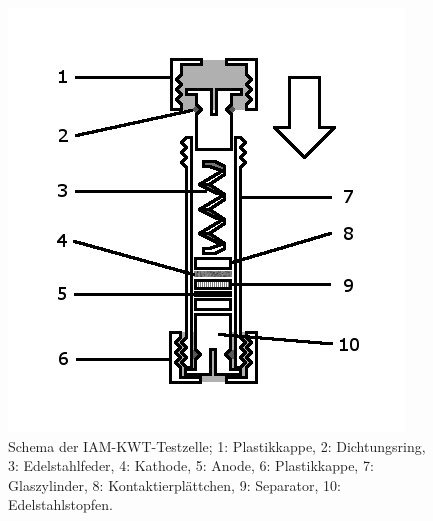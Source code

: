 \documentclass[a4paper, 11pt, headsepline,footsepline,twoside,abstract]{scrbook}
\begin{document}
\begin{figure}
	\centering
	\includegraphics[width=0.55\columnwidth]{images/Schema_Zelle.jpg}
	\caption{Schema der IAM-KWT-Testzelle; 
			1: Plastikkappe,
			2: Dichtungsring,
			3: Edelstahlfeder,
			4: Kathode,
			5: Anode,
			6: Plastikkappe,
			7: Glaszylinder,
			8: Kontaktierplättchen,
			9: Separator,
			10: Edelstahlstopfen.
			}
	\label{schema_zelle}
\end{figure}
\end{document}

